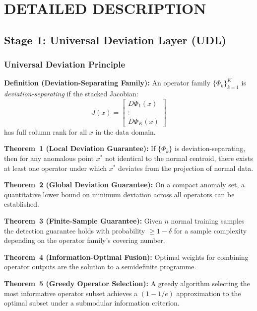 \documentclass[12pt,a4paper]{article}
\begin{document}
\section{DETAILED DESCRIPTION}

\subsection{Stage 1: Universal Deviation Layer (UDL)}
\label{sec:udl}

\subsubsection{Universal Deviation Principle}

\textbf{Definition (Deviation-Separating Family):} An operator family
$\{\Phi_k\}_{k=1}^{K}$ is \emph{deviation-separating} if the stacked
Jacobian:
\begin{equation}
J(x) = \begin{bmatrix}D\Phi_1(x)\\\vdots\\D\Phi_K(x)\end{bmatrix}
\end{equation}
has full column rank for all $x$ in the data domain.

\textbf{Theorem~1 (Local Deviation Guarantee):} If $\{\Phi_k\}$ is
deviation-separating, then for any anomalous point $x^*$ not identical
to the normal centroid, there exists at least one operator under which
$x^*$ deviates from the projection of normal data.

\textbf{Theorem~2 (Global Deviation Guarantee):} On a compact anomaly
set, a quantitative lower bound on minimum deviation across all operators
can be established.

\textbf{Theorem~3 (Finite-Sample Guarantee):} Given $n$ normal training
samples the detection guarantee holds with probability $\geq 1-\delta$
for a sample complexity depending on the operator family's covering number.

\textbf{Theorem~4 (Information-Optimal Fusion):} Optimal weights for
combining operator outputs are the solution to a semidefinite programme.

\textbf{Theorem~5 (Greedy Operator Selection):} A greedy algorithm
selecting the most informative operator subset achieves a $(1-1/e)$
approximation to the optimal subset under a submodular information
criterion.
\end{document}
